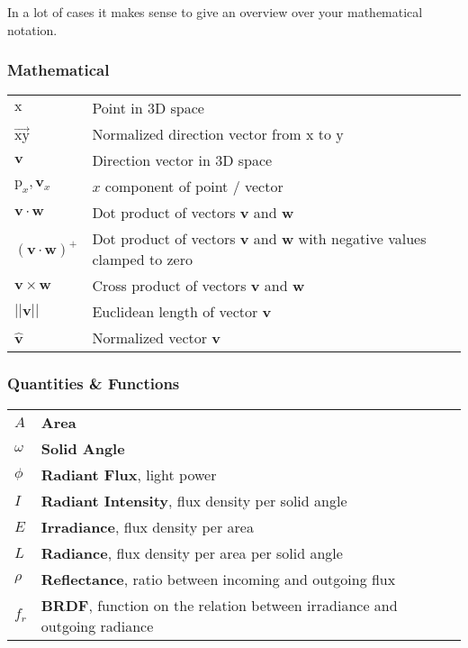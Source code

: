 \documentclass[thesis.tex]{subfiles}
\begin{document}

In a lot of cases it makes sense to give an overview over your mathematical notation.

\subsubsection*{Mathematical}

\begin{tabular}{ l l }
$\mathrm{x}$ & Point in 3D space \\
$\overrightarrow{\mathrm{x}\mathrm{y}}$ & Normalized direction vector from $\mathrm{x}$ to $\mathrm{y}$\\
$\mathbf{v}$ & Direction vector in 3D space \\
$\mathrm{p}_x, \mathbf{v}_x$ & $x$ component of point / vector\\
$\mathbf{v} \cdot \mathbf{w}$ & Dot product of vectors $\mathbf{v}$ and $\mathbf{w}$\\
$(\mathbf{v} \cdot \mathbf{w})^+$ & Dot product of vectors $\mathbf{v}$ and $\mathbf{w}$ with negative values clamped to zero\\
$\mathbf{v} \times \mathbf{w}$ & Cross product of vectors $\mathbf{v}$ and $\mathbf{w}$\\
$||\mathbf{v}||$ & Euclidean length of vector $\mathbf{v}$\\
$\hat{\mathbf{v}}$ & Normalized vector $\mathbf{v}$
\end{tabular}


\subsubsection*{Quantities \& Functions}

\begin{tabular}{ l l l}
$A$ & \textbf{Area}\\
$\omega$ & \textbf{Solid Angle}\\
$\phi$ & \textbf{Radiant Flux}, light power\\
$I$ & \textbf{Radiant Intensity}, flux density per solid angle\\
$E$ & \textbf{Irradiance}, flux density per area\\
$L$ & \textbf{Radiance}, flux density per area per solid angle\\
$\rho$ & \textbf{Reflectance}, ratio between incoming and outgoing flux\\
$f_r$ & \textbf{BRDF}, function on the relation between irradiance and outgoing radiance\\
\end{tabular}
\end{document}
